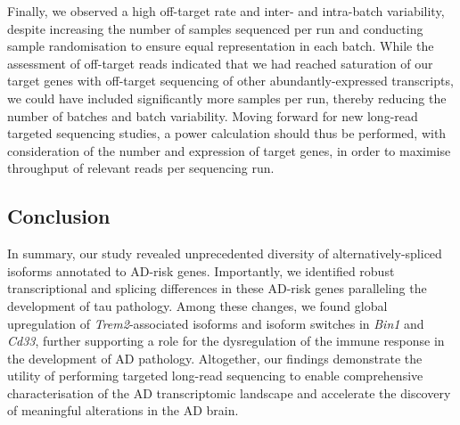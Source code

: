 Finally, we observed a high off-target rate and inter- and intra-batch variability, despite increasing the number of samples sequenced per run and conducting sample randomisation to ensure equal representation in each batch. While the assessment of off-target reads indicated that we had reached saturation of our target genes with off-target sequencing of other abundantly-expressed transcripts, we could have included significantly more samples per run, thereby reducing the number of batches and batch variability. Moving forward for new long-read targeted sequencing studies, a power calculation should thus be performed, with consideration of the number and expression of target genes, in order to maximise throughput of relevant reads per sequencing run.      
    
\subsection{Conclusion}
In summary, our study revealed unprecedented diversity of alternatively-spliced isoforms annotated to AD-risk genes. Importantly, we identified robust transcriptional and splicing differences in these AD-risk genes paralleling the development of tau pathology. Among these changes, we found global upregulation of \textit{Trem2}-associated isoforms and isoform switches in \textit{Bin1} and \textit{Cd33}, further supporting a role for the dysregulation of the immune response in the development of AD pathology. Altogether, our findings demonstrate the utility of performing targeted long-read sequencing to enable comprehensive characterisation of the AD transcriptomic landscape and accelerate the discovery of meaningful alterations in the AD brain.  


